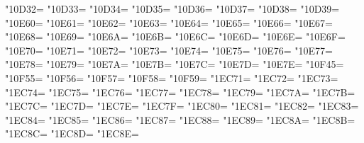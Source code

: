 \XeTeXcharclass"10D32=\KclassArabU
\XeTeXcharclass"10D33=\KclassArabU
\XeTeXcharclass"10D34=\KclassArabU
\XeTeXcharclass"10D35=\KclassArabU
\XeTeXcharclass"10D36=\KclassArabU
\XeTeXcharclass"10D37=\KclassArabU
\XeTeXcharclass"10D38=\KclassArabU
\XeTeXcharclass"10D39=\KclassArabU
\XeTeXcharclass"10E60=\KclassArabU
\XeTeXcharclass"10E61=\KclassArabU
\XeTeXcharclass"10E62=\KclassArabU
\XeTeXcharclass"10E63=\KclassArabU
\XeTeXcharclass"10E64=\KclassArabU
\XeTeXcharclass"10E65=\KclassArabU
\XeTeXcharclass"10E66=\KclassArabU
\XeTeXcharclass"10E67=\KclassArabU
\XeTeXcharclass"10E68=\KclassArabU
\XeTeXcharclass"10E69=\KclassArabU
\XeTeXcharclass"10E6A=\KclassArabU
\XeTeXcharclass"10E6B=\KclassArabU
\XeTeXcharclass"10E6C=\KclassArabU
\XeTeXcharclass"10E6D=\KclassArabU
\XeTeXcharclass"10E6E=\KclassArabU
\XeTeXcharclass"10E6F=\KclassArabU
\XeTeXcharclass"10E70=\KclassArabU
\XeTeXcharclass"10E71=\KclassArabU
\XeTeXcharclass"10E72=\KclassArabU
\XeTeXcharclass"10E73=\KclassArabU
\XeTeXcharclass"10E74=\KclassArabU
\XeTeXcharclass"10E75=\KclassArabU
\XeTeXcharclass"10E76=\KclassArabU
\XeTeXcharclass"10E77=\KclassArabU
\XeTeXcharclass"10E78=\KclassArabU
\XeTeXcharclass"10E79=\KclassArabU
\XeTeXcharclass"10E7A=\KclassArabU
\XeTeXcharclass"10E7B=\KclassArabU
\XeTeXcharclass"10E7C=\KclassArabU
\XeTeXcharclass"10E7D=\KclassArabU
\XeTeXcharclass"10E7E=\KclassArabU
\XeTeXcharclass"10F45=\KclassArabU
\XeTeXcharclass"10F55=\KclassArabU
\XeTeXcharclass"10F56=\KclassArabU
\XeTeXcharclass"10F57=\KclassArabU
\XeTeXcharclass"10F58=\KclassArabU
\XeTeXcharclass"10F59=\KclassArabU
\XeTeXcharclass"1EC71=\KclassArabU
\XeTeXcharclass"1EC72=\KclassArabU
\XeTeXcharclass"1EC73=\KclassArabU
\XeTeXcharclass"1EC74=\KclassArabU
\XeTeXcharclass"1EC75=\KclassArabU
\XeTeXcharclass"1EC76=\KclassArabU
\XeTeXcharclass"1EC77=\KclassArabU
\XeTeXcharclass"1EC78=\KclassArabU
\XeTeXcharclass"1EC79=\KclassArabU
\XeTeXcharclass"1EC7A=\KclassArabU
\XeTeXcharclass"1EC7B=\KclassArabU
\XeTeXcharclass"1EC7C=\KclassArabU
\XeTeXcharclass"1EC7D=\KclassArabU
\XeTeXcharclass"1EC7E=\KclassArabU
\XeTeXcharclass"1EC7F=\KclassArabU
\XeTeXcharclass"1EC80=\KclassArabU
\XeTeXcharclass"1EC81=\KclassArabU
\XeTeXcharclass"1EC82=\KclassArabU
\XeTeXcharclass"1EC83=\KclassArabU
\XeTeXcharclass"1EC84=\KclassArabU
\XeTeXcharclass"1EC85=\KclassArabU
\XeTeXcharclass"1EC86=\KclassArabU
\XeTeXcharclass"1EC87=\KclassArabU
\XeTeXcharclass"1EC88=\KclassArabU
\XeTeXcharclass"1EC89=\KclassArabU
\XeTeXcharclass"1EC8A=\KclassArabU
\XeTeXcharclass"1EC8B=\KclassArabU
\XeTeXcharclass"1EC8C=\KclassArabU
\XeTeXcharclass"1EC8D=\KclassArabU
\XeTeXcharclass"1EC8E=\KclassArabU
